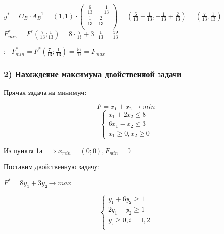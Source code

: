 \begin{flushleft}
$y^{*} = C_{B} \cdot A_{B}^{-1} = (1; 1) \cdot \begin{pmatrix}
\frac{6}{13} & -\frac{1}{13} \\
\frac{1}{13} & \frac{2}{13} \\
\end{pmatrix} = (\frac{6}{13} + \frac{1}{13}; -\frac{1}{13} + \frac{2}{13}) = (\frac{7}{13}; \frac{1}{13})$ \\
$F_{min}^{*} = F^{*}(\frac{7}{13}; \frac{1}{13}) = 8 \cdot \frac{7}{13} + 3 \cdot \frac{1}{13} = \frac{59}{13}$
\end{flushleft}

{:~} $F_{min}^{*} = F^{*}(\frac{7}{13}; \frac{1}{13}) = \frac{59}{13} = F_{max}$



\subsubsection{2) Нахождение максимума двойственной задачи}

\begin{flushleft}
Прямая задача на минимум:
\end{flushleft}

\begin{equation*}
    F = x_1 + x_2 \rightarrow min
\end{equation*}
\begin{equation*}
    \begin{cases}
        x_1 + 2x_2 \le 8 \\
        6x_1 - x_2 \le 3 \\
        x_1 \ge 0, x_2 \ge 0
    \end{cases}
\end{equation*}

\begin{flushleft}
Из пункта 1а $\implies x_{min} = (0; 0), F_{min} = 0$
\end{flushleft}

\begin{flushleft}
Поставим двойственную задачу:
\end{flushleft}

\begin{center}
    $F^{*} = 8y_1 + 3y_2 \rightarrow max$
\end{center}
\begin{equation*}
    \begin{cases}
        y_1 + 6y_2 \ge 1\\
        2y_1 - y_2 \ge 1\\
        y_i \ge 0, i = 1, 2\\
    \end{cases}
\end{equation*}

